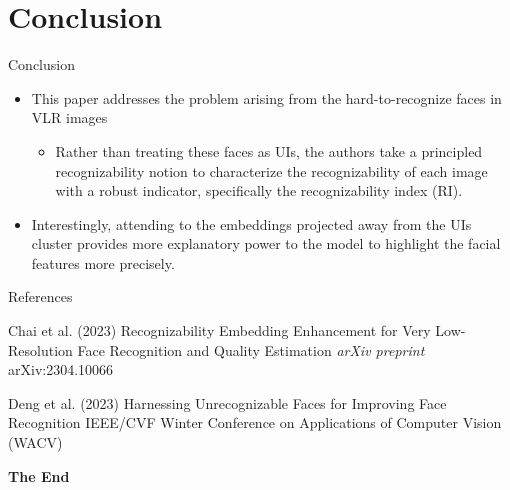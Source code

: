 \documentclass[aspectratio=169,xcolor=dvipsnames]{beamer}
\begin{document}
\section{Conclusion}
\begin{frame}{Conclusion}
    \begin{itemize}
        \item This paper addresses the problem arising from the hard-to-recognize faces in VLR images 
        \begin{itemize}
            \item Rather than treating these faces as UIs, the authors take a principled recognizability notion to characterize the recognizability of each image with a robust indicator, specifically the recognizability index (RI).
        \end{itemize}
        \item Interestingly, attending to the embeddings projected away from the UIs cluster provides more explanatory power to the model to highlight the facial features more precisely.
    \end{itemize}
\end{frame}

\begin{frame}{References}
    \footnotesize{
        \begin{thebibliography}{99}
             Chai et al. (2023)
            \newblock Recognizability Embedding Enhancement for Very Low-Resolution Face Recognition and Quality Estimation
            \newblock \emph{arXiv preprint} arXiv:2304.10066
        \end{thebibliography}
    }
    \footnotesize{
        \begin{thebibliography}{99}
             Deng et al. (2023)
            \newblock Harnessing Unrecognizable Faces for Improving Face Recognition
             IEEE/CVF Winter Conference on Applications of Computer Vision (WACV)
        \end{thebibliography}
    }
\end{frame}


\begin{frame}
    \Huge{\centerline{\textbf{The End}}}
\end{frame}

\end{document}

